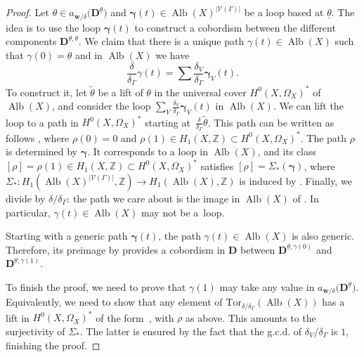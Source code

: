 \documentclass[pdftex]{sigma}
\newcommand{\Tor}{\mathrm{Tor}}
\newcommand{\Alb}{\operatorname{Alb}}
\newcommand{\ZZ}{\mathbb{Z}}
\newcommand{\btheta}{ {\underline{\theta}} }
\newcommand{\bfD}{ {\boldsymbol D} }
\newcommand{\bfw}{ {\boldsymbol w} }
\newcommand{\V}{\mathcal{V}}
\numberwithin{equation}{section}
\theoremstyle{definition}
\begin{document}
\begin{proof}
Let $\theta\in a_{\bfw/\delta}\bigl(\bfD^\btheta\bigr)$ and $\boldsymbol{\gamma}(t)\in\Alb(X)^{|\V(\Gamma)|}$ be a loop based at $\btheta$. The idea is to use the loop $\boldsymbol{\gamma}(t)$ to construct a cobordism between the different components $\bfD^{\btheta,\theta}$. We claim that there is a unique path $\gamma(t)\in\Alb(X)$ such that $\gamma(0)=\theta$ and in $\Alb(X)$ we have
\[ \frac{\delta}{\delta_\Gamma}\gamma(t)=\sum\frac{\delta_V}{\delta_\Gamma}\boldsymbol{\gamma}_V(t). \]
To construct it, let $\widetilde{\theta}$ be a lift of $\theta$ in the universal cover $H^0(X,\Omega_X)^*$ of $\Alb(X)$, and consider the loop $\sum_V \frac{\delta_V}{\delta_\Gamma}\boldsymbol{\gamma}_V(t)$ in $\Alb(X)$. We can lift the loop to a path in $H^0(X,\Omega_X)^*$ starting at~$\frac{\delta}{\delta_\Gamma}\widetilde{\theta}$. This path can be written as follows
,
where $\rho(0)=0$ and $\rho(1)\in H_1(X,\ZZ)\subset H^0(X,\Omega_X)^*$. The path $\rho$ is determined by $\boldsymbol{\gamma}$. It corresponds to a loop in $\Alb(X)$, and its class $[\rho]=\rho(1)\in H_1(X,\ZZ)\subset H^0(X,\Omega_X)^*$ satisfies $[\rho]=\Sigma_*(\boldsymbol{\gamma})$, where $\Sigma_*\colon H_1(\Alb(X)^{|\V(\Gamma)|},\ZZ)\to H_1(\Alb(X),\ZZ)$ is induced by .
Finally, we divide by $\delta/\delta_\Gamma$: the path we care about is the image in $\Alb(X)$ of .
In particular, $\gamma(t)\in\Alb(X)$ may not be a~loop.

Starting with a generic path $\boldsymbol{\gamma}(t)$, the path $\gamma(t)\in\Alb(X)$ is also generic. Therefore, its preimage by \smash{$a_{\bfw/\delta}|_{\bfD}\colon \bfD\to\Alb(X)$} provides a cobordism in $\bfD$ between $\bfD^{\btheta,\gamma(0)}$ and $\bfD^{\btheta,\gamma(1)}$.

To finish the proof, we need to prove that $\gamma(1)$ may take any value in $a_{\bfw/\delta}\bigl(\bfD^\btheta\bigr)$. Equivalently, we need to show that any element of $\Tor_{\delta/\delta_\Gamma}(\Alb(X))$ has a lift in $H^0(X,\Omega_X)^*$ of the form~, with $\rho$ as above. This amounts to the surjectivity of $\Sigma_*$. The latter is ensured by the fact that the g.c.d. of $\delta_V/\delta_\Gamma$ is $1$, finishing the proof.
\end{proof}
\end{document}
